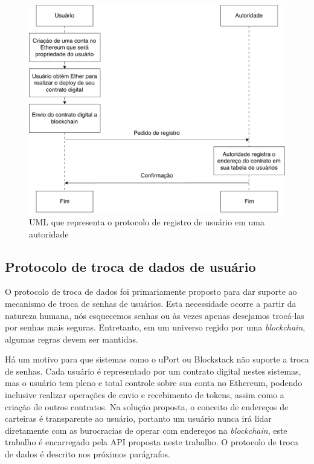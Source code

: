 \documentclass[tcc,capa]{texufpel}
\begin{document}
        \begin{figure}[!h]
            \centering
            \includegraphics[width=15cm]{imagens/protocolo-registro.pdf}
            \caption{UML que representa o protocolo de registro de usuário em uma autoridade}
            \label{fig:registro-contrato}
        \end{figure}
    
    \subsection{Protocolo de troca de dados de usuário}
    
        O protocolo de troca de dados foi primariamente proposto para dar suporte ao mecanismo de troca de senhas de usuários. Esta necessidade ocorre a partir da natureza humana, nós esquecemos senhas ou às vezes apenas desejamos trocá-las por senhas mais seguras. Entretanto, em um universo regido por uma \textit{blockchain}, algumas regras devem ser mantidas.
        
        Há um motivo para que sistemas como o uPort ou Blockstack não suporte a troca de senhas. Cada usuário é representado por um contrato digital nestes sistemas, mas o usuário tem pleno e total controle sobre sua conta no Ethereum, podendo inclusive realizar operações de envio e recebimento de tokens, assim como a criação de outros contratos. Na solução proposta, o conceito de endereços de carteiras é transparente ao usuário, portanto um usuário nunca irá lidar diretamente com as burocracias de operar com endereços na \textit{blockchain}, este trabalho é encarregado pela API proposta neste trabalho. O protocolo de troca de dados é descrito nos próximos parágrafos.
        
\end{document}
